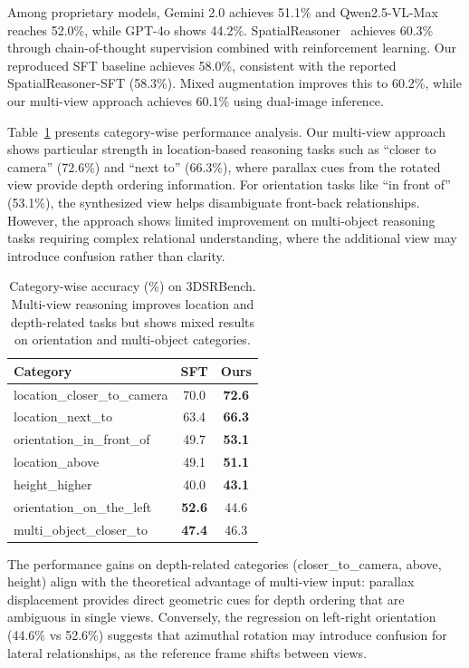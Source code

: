 Among proprietary models, Gemini 2.0 achieves 51.1\% and Qwen2.5-VL-Max reaches 52.0\%, while GPT-4o shows 44.2\%. SpatialReasoner~\cite{ma2025spatialreasoner} achieves 60.3\% through chain-of-thought supervision combined with reinforcement learning. Our reproduced SFT baseline achieves 58.0\%, consistent with the reported SpatialReasoner-SFT (58.3\%). Mixed augmentation improves this to 60.2\%, while our multi-view approach achieves 60.1\% using dual-image inference.

Table~\ref{tab:category-results} presents category-wise performance analysis. Our multi-view approach shows particular strength in location-based reasoning tasks such as ``closer to camera'' (72.6\%) and ``next to'' (66.3\%), where parallax cues from the rotated view provide depth ordering information. For orientation tasks like ``in front of'' (53.1\%), the synthesized view helps disambiguate front-back relationships. However, the approach shows limited improvement on multi-object reasoning tasks requiring complex relational understanding, where the additional view may introduce confusion rather than clarity.

\begin{table}[ht]
\centering
\small
\begin{tabular}{lcc}
\toprule
\textbf{Category} & \textbf{SFT} & \textbf{Ours} \\
\midrule
location\_closer\_to\_camera & 70.0 & \textbf{72.6} \\
location\_next\_to & 63.4 & \textbf{66.3} \\
orientation\_in\_front\_of & 49.7 & \textbf{53.1} \\
location\_above & 49.1 & \textbf{51.1} \\
height\_higher & 40.0 & \textbf{43.1} \\
\midrule
orientation\_on\_the\_left & \textbf{52.6} & 44.6 \\
multi\_object\_closer\_to & \textbf{47.4} & 46.3 \\
\bottomrule
\end{tabular}
\caption{Category-wise accuracy (\%) on 3DSRBench. Multi-view reasoning improves location and depth-related tasks but shows mixed results on orientation and multi-object categories.}
\label{tab:category-results}
\end{table}

The performance gains on depth-related categories (closer\_to\_camera, above, height) align with the theoretical advantage of multi-view input: parallax displacement provides direct geometric cues for depth ordering that are ambiguous in single views. Conversely, the regression on left-right orientation (44.6\% vs 52.6\%) suggests that azimuthal rotation may introduce confusion for lateral relationships, as the reference frame shifts between views.

